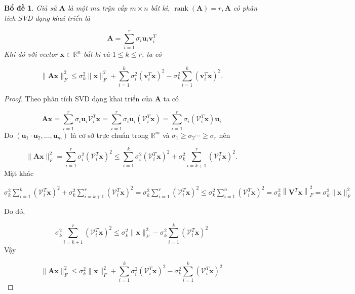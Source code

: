 \documentclass[12pt,a4paper,oneside]{report}
\newtheorem{bd}{Bổ đề} [section]
\numberwithin{equation}{section}
\begin{document}
\begin{bd} \label{bode} Giả sử $\mathbf{A}$ là một ma trận cấp $m \times n$ bất kì, $\operatorname{rank}(\mathbf{A})=r, \mathbf{A}$ có phân tích SVD dạng khai triển là

$$
\mathbf{A}=\sum_{i=1}^{r} \sigma_{i} \mathbf{u}_{i} \mathbf{v}_{i}^{T}
$$
Khi đó với vector $\mathbf{x} \in \mathbb{R}^{n}$ bất kì và $1 \leqslant k \leqslant r$, ta có

$$
\|\mathbf{A} \mathbf{x}\|_{F}^{2} \leqslant \sigma_{k}^{2}\|\mathbf{x}\|_{F}^{2}+\sum_{i=1}^{k} \sigma_{i}^{2}\left(\mathbf{v}_{i}^{T} \mathbf{x}\right)^{2}-\sigma_{k}^{2} \sum_{i=1}^{k}\left(\mathbf{v}_{i}^{T} \mathbf{x}\right)^{2} .
$$
\end{bd}
\begin{proof}
Theo phân tích SVD dạng khai triển của $\mathbf{A}$ ta có

$$
\mathbf{A} \mathbf{x}=\sum_{i=1}^{r} \sigma_{i} \mathbf{u}_{i} \mathcal{V}_{i}^{T} \mathbf{x}=\sum_{i=1}^{r} \sigma_{i} \mathbf{u}_{i}\left(\mathcal{V}_{i}^{T} \mathbf{x}\right)=\sum_{i=1}^{r} \sigma_{i}\left(\mathcal{V}_{i}^{T} \mathbf{x}\right) \mathbf{u}_{i}
$$
Do $\left(\mathbf{u}_{1} \cdot \mathbf{u}_{2}, \ldots, \mathbf{u}_{m}\right)$ là cơ sở trực chuẩn trong $\mathbb{R}^{m}$ và $\sigma_{1} \geqslant \sigma_{2} \cdots \geqslant \sigma_{r}$ nên

$$
\|\mathbf{A} \mathbf{x}\|_{F}^{2}=\sum_{i=1}^{r} \sigma_{i}^{2}\left(\mathcal{V}_{i}^{T} \mathbf{x}\right)^{2} \leqslant \sum_{i=1}^{k} \sigma_{i}^{2}\left(\mathcal{V}_{i}^{T} \mathbf{x}\right)^{2}+\sigma_{k}^{2} \sum_{i=k+1}^{r}\left(\mathcal{V}_{i}^{T} \mathbf{x}\right)^{2} .
$$
Mặt khác

$\sigma_{k}^{2} \sum_{i=1}^{k}\left(\mathcal{V}_{i}^{T} \mathbf{x}\right)^{2}+\sigma_{k}^{2} \sum_{i=k+1}^{r}\left(\mathcal{V}_{i}^{T} \mathbf{x}\right)^{2}=\sigma_{k}^{2} \sum_{i=1}^{r}\left(\mathcal{V}_{i}^{T} \mathbf{x}\right)^{2} \leqslant \sigma_{k}^{2} \sum_{i=1}^{n}\left(\mathcal{V}_{i}^{T} \mathbf{x}\right)^{2}=\sigma_{k}^{2}\left\|\mathbf{V}^{T} \mathbf{x}\right\|_{F}^{2}=\sigma_{k}^{2}\|\mathbf{x}\|_{F}^{2}$

Do đó,

$$
\sigma_{k}^{2} \sum_{i=k+1}^{r}\left(\mathcal{V}_{i}^{T} \mathbf{x}\right)^{2} \leqslant \sigma_{k}^{2}\|\mathbf{x}\|_{F}^{2}-\sigma_{k}^{2} \sum_{i=1}^{k}\left(\mathcal{V}_{i}^{T} \mathbf{x}\right)^{2}
$$
Vậy

$$
\|\mathbf{A} \mathbf{x}\|_{F}^{2} \leqslant \sigma_{k}^{2}\|\mathbf{x}\|_{F}^{2}+\sum_{i=1}^{k} \sigma_{i}^{2}\left(\mathcal{V}_{i}^{T} \mathbf{x}\right)^{2}-\sigma_{k}^{2} \sum_{i=1}^{k}\left(\mathcal{V}_{i}^{T} \mathbf{x}\right)^{2}
$$
\end{proof}
\end{document}
